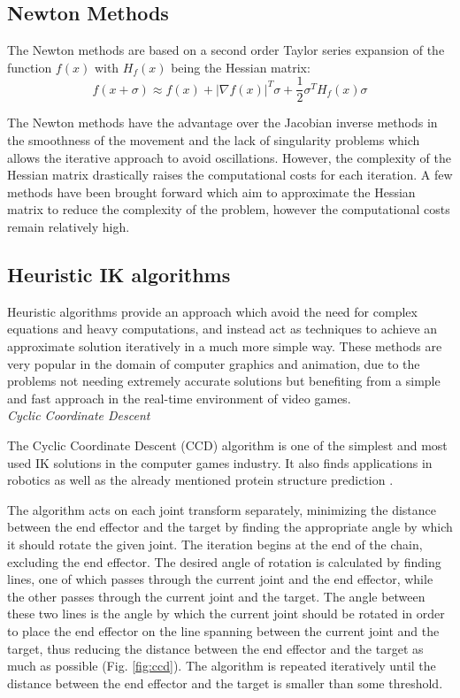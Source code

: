 \subsection{Newton Methods}
The Newton methods are based on a second order Taylor series expansion of the
function \(f(x)\) with \(H_f(x)\) being the Hessian matrix:
\begin{equation}
    f(x + \sigma) \approx f(x) + |\nabla f(x)|^T \sigma + \frac{1}{2} \sigma^T H_f(x)
    \sigma
\end{equation}

The Newton methods have the advantage over the Jacobian inverse methods in the
smoothness of the movement and the lack of singularity problems which allows the
iterative approach to avoid oscillations. However, the complexity of the Hessian
matrix drastically raises the computational costs for each iteration. A few
methods have been brought forward which aim to approximate the Hessian matrix
to reduce the complexity of the problem, however the computational costs remain
relatively high.

\subsection{Heuristic IK algorithms}
Heuristic algorithms provide an approach which avoid the need for complex
equations and heavy computations, and instead act as techniques to achieve an
approximate solution iteratively in a much more simple way. These methods are
very popular in the domain of computer graphics and animation, due to the
problems not needing extremely accurate solutions but benefiting from a simple
and fast approach in the real-time environment of video games. \\

\noindent\textit{Cyclic Coordinate Descent}

The Cyclic Coordinate Descent (CCD) algorithm \cite{ccd} is one of the simplest and most
used IK solutions in the computer games industry. It also finds
applications in robotics as well as the already mentioned protein structure
prediction \cite{ccd_protein}. 

The algorithm acts on each joint transform separately, minimizing the distance
between the end effector and the target by finding the appropriate angle by
which it should rotate the given joint. The iteration begins at the end of the
chain, excluding the end effector. The desired angle of rotation is calculated by
finding lines, one of which passes through the current joint and the end
effector, while the other passes through the current joint and the target. The
angle between these two lines is the angle by which the current joint should
be rotated in order to place the end effector on the line spanning between the
current joint and the target, thus reducing the distance between the end
effector and the target as much as possible (Fig. \ref{fig:ccd}). The
algorithm is repeated iteratively until the distance between the end effector
and the target is smaller than some threshold.

